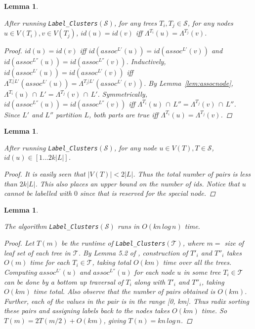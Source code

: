 \documentclass{article}
\newcommand{\leafset}{\Lambda}
\newtheorem{labelclusterscorrectness}[incompatibility]{Lemma}
\newtheorem{labelclustersidbounds}[incompatibility]{Lemma}
\newtheorem{labelclustersruntime}[incompatibility]{Lemma}
\begin{document}
    \medskip
    \begin{labelclusterscorrectness}
        \label{lem:labelclusterscorrectness}

        After running \texttt{Label\_Clusters}$(\mathcal{S})$, for any trees $T_i, T_j \in \mathcal{S}$, for any nodes $u \in V(T_i), v \in V(T_j)$, $id(u) = id(v)$ iff $\leafset^{T_i}(u) = \leafset^{T_j}(v)$.

        \begin{proof}
            $id(u) = id(v)$ iff $id(assoc^{L'}(u)) = id(assoc^{L'}(v))$ and $id(assoc^{L''}(u)) = id(assoc^{L''}(v))$. Inductively, $id(assoc^{L'}(u)) = id(assoc^{L'}(v))$ iff $\leafset^{T_i|L'}(assoc^{L'}(u)) = \leafset^{T_j|L'}(assoc^{L'}(v))$. By Lemma~\ref{lem:assocnode}, $\leafset^{T_i}(u)\, \cap\, L' = \leafset^{T_j}(v)\, \cap\, L'$. Symmetrically, $id(assoc^{L''}(u)) = id(assoc^{L''}(v))$ iff $\leafset^{T_i}(u)\, \cap\, L'' = \leafset^{T_j}(v)\, \cap\, L''$. Since $L'$ and $L''$ partition $L$, both parts are true iff $\leafset^{T_i}(u) = \leafset^{T_j}(v)$.
        \end{proof}
    \end{labelclusterscorrectness}

    \medskip
    \begin{labelclustersidbounds}
        \label{lem:labelclustersidbounds}

        After running \texttt{Label\_Clusters}$(\mathcal{S})$, for any node $u \in V(T), T \in \mathcal{S}$, $id(u) \in [1 ... 2k |L|]$.

        \begin{proof}
            It is easily seen that $|V(T)| < 2|L|$. Thus the total number of pairs is less than $2k|L|$. This also places an upper bound on the number of ids. Notice that $u$ cannot be labelled with $0$ since that is reserved for the special node.
        \end{proof}
    \end{labelclustersidbounds}

    \medskip
    \begin{labelclustersruntime}
        \label{lem:labelclustersruntime}

        The algorithm \texttt{Label\_Clusters}$(\mathcal{S})$ runs in $O(kn\,log\,n)$ time.

        \begin{proof}
            Let $T(m)$ be the runtime of \texttt{Label\_Clusters}$(\mathcal{T})$, where $m =$ size of leaf set of each tree in $\mathcal{T}$. By Lemma 5.2 of \cite{farach1995fast}, construction of $T'_i$ and $T''_i$ takes $O(m)$ time for each $T_i \in \mathcal{T}$, taking total $O(km)$ time over all the trees. Computing $assoc^{L'}(u)$ and $assoc^{L''}(u)$ for each node $u$ in some tree $T_i \in \mathcal{T}$ can be done by a bottom up traversal of $T_i$ along with $T'_i$ and $T''_i$, taking $O(km)$ time total. Also observe that the number of pairs obtained is $O(km)$. Further, each of the values in the pair is in the range [0, km]. Thus radix sorting these pairs and assigning labels back to the nodes takes $O(km)$ time. So $T(m) = 2T(m/2) + O(km)$, giving $T(n) = kn\,log\,n$.
        \end{proof}
    \end{labelclustersruntime}
\end{document}
